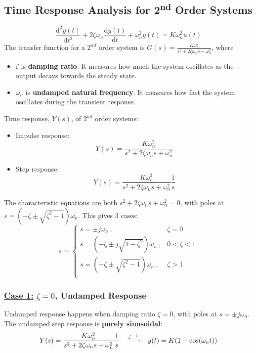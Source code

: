 \subsection{Time Response Analysis for 2\textsuperscript{nd} Order Systems}
\[\frac{\mathrm{d}^{2}y(t)}{\mathrm{d}t^{2}}+2\zeta\omega_{n}\frac{\mathrm{d}y(t)}{\mathrm{d}t}+\omega_{n}^{2}y(t) = K\omega_{n}^{2}u(t)\]
The transfer function for a $2^{nd}$ order system is $\displaystyle G(s)= \frac{K\omega_{n}^{2}}{s^{2}+2\zeta\omega_{n}s+\omega_{n}^{2}}$, where
\begin{itemize}
    \item $\zeta$ is \textbf{damping ratio}. It measures how much the system oscillates as the output decays towards the steady state.
    
    \item $\omega_{n}$ is \textbf{undamped natural frequency}. It measures how fast the system oscillates during the transient response.
\end{itemize}
Time response, $Y(s)$, of  $2^{nd}$ order systems:
\begin{itemize}
    \item Impulse response:\[Y(s)= \frac{K\omega_{n}^{2}}{s^{2}+2\zeta\omega_{n}s+\omega_{n}^{2}}\]
    
    \item Step response:\[Y(s)= \frac{K\omega_{n}^{2}}{s^{2}+2\zeta\omega_{n}s+\omega_{n}^{2}}\frac{1}{s}\]
\end{itemize}
The characteristic equations are both $s^{2}+2\zeta\omega_{n}s+\omega_{n}^{2}=0$, with poles at $s = (-\zeta\pm \sqrt{\zeta^{2}-1})\omega_{n}$.
This gives 3 cases: 
    \[
    s=\begin{cases}
    s = \pm j\omega_{n}\ ,&\zeta = 0\\
    s = (-\zeta\pm j\sqrt{1-\zeta^{2}})\omega_{n}\ , & 0<\zeta<1\\
    s = (-\zeta\pm \sqrt{\zeta^{2}-1})\omega_{n}\ , &\zeta>1\\
    \end{cases} 
    \]

\subsubsection{\underline{Case 1:} $\zeta = 0$, Undamped Response}
Undamped response happens when damping ratio $\zeta=0$, with poles at $s = \pm j\omega_{n}$.
The undamped step response is \textbf{purely sinusoidal}:
\[
Y(s) = \frac{K\omega_{n}^{2}}{s^{2}	+2\zeta\omega_{n}s+\omega_{n}^{2}}\frac{1}{s}
\quad  {\color{gray}\xrightarrow{\mathcal{L}^{-1}}} \quad
y(t) = K(1-\cos(\omega_{n}t)) 
\]

